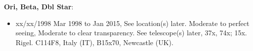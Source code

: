 {\bf Ori, Beta, Dbl Star}:
\begin{itemize}
\item xx/xx/1998 Mar 1998 to Jan 2015, See location(s) later. Moderate to perfect seeing, Moderate to clear transparency. See telescope(s) later, 37x, 74x; 15x. Rigel. C114F8, Italy (IT), B15x70, Newcastle (UK).
\end{itemize}
